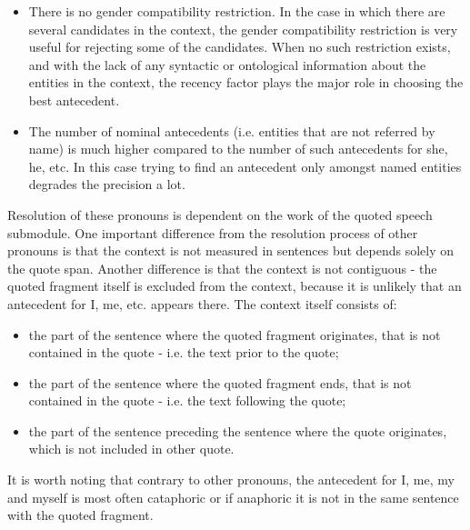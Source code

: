   \begin{itemize}
  \item
  There is no gender compatibility restriction. In the case in which there
  are several candidates in the context, the gender compatibility
  restriction is very useful for rejecting some of the
  candidates. When no such restriction exists, and with the lack of
  any syntactic or ontological information about the entities in the
  context, the recency factor plays the major role in choosing the
  best antecedent.

  \item
  The number of nominal antecedents (i.e. entities that are not referred
  by name) is much higher compared to the number of such
  antecedents for she, he, etc. In this case trying to find an antecedent
  only amongst named entities degrades the precision a lot.
  \end{itemize}


Resolution of these pronouns is dependent on the work of the quoted speech submodule.
One important difference from the resolution process of other pronouns
is that the context is not measured in sentences but depends solely on
the quote span. Another difference is that the context is not
contiguous - the quoted fragment itself is excluded from the context,
because it is unlikely that an antecedent for I, me, etc. appears
there. The context itself consists of:
  \begin{itemize}
  \item
  the part of the sentence where the quoted fragment originates, that
is not contained in the quote - i.e. the text prior to the quote;

  \item
  the part of the sentence where the quoted fragment ends, that is not
  contained in the quote - i.e. the text following the quote;

  \item
  the part of the sentence preceding the sentence where the quote
  originates, which is not included in other quote.
  \end{itemize}

It is worth noting that contrary to other pronouns, the antecedent for
I, me, my and  myself is most often cataphoric or if anaphoric it is
not in the same sentence with the quoted fragment.

